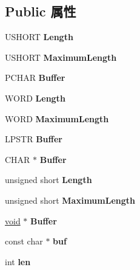 \subsection*{Public 属性}
\begin{DoxyCompactItemize}
\item 
\mbox{\label{struct___s_t_r_i_n_g_a42053951503fd821638234bd01a1c6c7}} 
U\+S\+H\+O\+RT {\bfseries Length}
\item 
\mbox{\label{struct___s_t_r_i_n_g_a51da46a492a3ce1a490f9fa32bb37c0b}} 
U\+S\+H\+O\+RT {\bfseries Maximum\+Length}
\item 
\mbox{\label{struct___s_t_r_i_n_g_aaaaa56a4176d7ae875eaea419d56799f}} 
P\+C\+H\+AR {\bfseries Buffer}
\item 
\mbox{\label{struct___s_t_r_i_n_g_aabedaaa30902d2e414db82aa9e5bf9e0}} 
W\+O\+RD {\bfseries Length}
\item 
\mbox{\label{struct___s_t_r_i_n_g_a6787e7fd778bd48ddaa09b1edd18e6be}} 
W\+O\+RD {\bfseries Maximum\+Length}
\item 
\mbox{\label{struct___s_t_r_i_n_g_a7024a0e0e1a4c44d34885f76b36a04dd}} 
L\+P\+S\+TR {\bfseries Buffer}
\item 
\mbox{\label{struct___s_t_r_i_n_g_abcb72fc1250ac883252ab59f8fa1106e}} 
C\+H\+AR $\ast$ {\bfseries Buffer}
\item 
\mbox{\label{struct___s_t_r_i_n_g_a39f7ccc227979937063c6daf80ee1f91}} 
unsigned short {\bfseries Length}
\item 
\mbox{\label{struct___s_t_r_i_n_g_a6ad9383c2d5fe71658fb4011c1a62ba0}} 
unsigned short {\bfseries Maximum\+Length}
\item 
\mbox{\label{struct___s_t_r_i_n_g_a190cebbb31fd9b96ef575a7e1a675b97}} 
\hyperlink{interfacevoid}{void} $\ast$ {\bfseries Buffer}
\item 
\mbox{\label{struct___s_t_r_i_n_g_a505f2731b317d62c4064e2172c34131c}} 
const char $\ast$ {\bfseries buf}
\item 
\mbox{\label{struct___s_t_r_i_n_g_ab65c927e6186cda993c3f46600afc317}} 
int {\bfseries len}
\end{DoxyCompactItemize}


